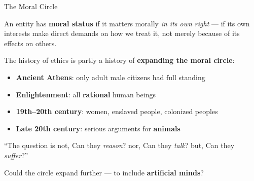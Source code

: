 \documentclass[aspectratio=169,11pt]{beamer}
\begin{document}
\begin{frame}[shrink=8]{The Moral Circle}
\begin{conceptbox}
An entity has \textbf{moral status} if it matters morally \emph{in its own right} --- if its own interests make direct demands on how we treat it, not merely because of its effects on others.
\end{conceptbox}

The history of ethics is partly a history of \textbf{expanding the moral circle}:
\begin{itemize}
    \item \textbf{Ancient Athens}: only adult male citizens had full standing
    \item \textbf{Enlightenment}: all \textbf{rational} human beings
    \item \textbf{19th--20th century}: women, enslaved people, colonized peoples
    \item \textbf{Late 20th century}: serious arguments for \textbf{animals}
\end{itemize}

\begin{quotebox}[Bentham (1789)]
\small ``The question is not, Can they \emph{reason}? nor, Can they \emph{talk}? but, Can they \emph{suffer}?''
\end{quotebox}

Could the circle expand further --- to include \textbf{artificial minds}?
\end{frame}
\end{document}
